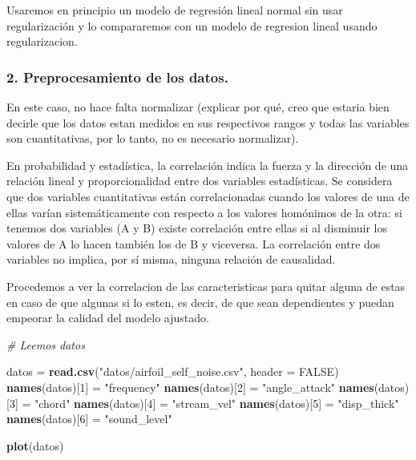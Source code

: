 \documentclass[]{article}
\newenvironment{Shaded}{\begin{snugshade}}{\end{snugshade}}
\newcommand{\KeywordTok}[1]{\textcolor[rgb]{0.13,0.29,0.53}{\textbf{#1}}}
\newcommand{\DataTypeTok}[1]{\textcolor[rgb]{0.13,0.29,0.53}{#1}}
\newcommand{\DecValTok}[1]{\textcolor[rgb]{0.00,0.00,0.81}{#1}}
\newcommand{\StringTok}[1]{\textcolor[rgb]{0.31,0.60,0.02}{#1}}
\newcommand{\CommentTok}[1]{\textcolor[rgb]{0.56,0.35,0.01}{\textit{#1}}}
\newcommand{\OtherTok}[1]{\textcolor[rgb]{0.56,0.35,0.01}{#1}}
\newcommand{\NormalTok}[1]{#1}
\begin{document}
Usaremos en principio un modelo de regresión lineal normal sin usar
regularización y lo compararemos con un modelo de regresion lineal
usando regularizacion.

\subsubsection{2. Preprocesamiento de los
datos.}\label{preprocesamiento-de-los-datos.-1}

En este caso, no hace falta normalizar (explicar por qué, creo que
estaria bien decirle que los datos estan medidos en sus respectivos
rangos y todas las variables son cuantitativas, por lo tanto, no es
necesario normalizar).

En probabilidad y estadística, la correlación indica la fuerza y la
dirección de una relación lineal y proporcionalidad entre dos variables
estadísticas. Se considera que dos variables cuantitativas están
correlacionadas cuando los valores de una de ellas varían
sistemáticamente con respecto a los valores homónimos de la otra: si
tenemos dos variables (A y B) existe correlación entre ellas si al
disminuir los valores de A lo hacen también los de B y viceversa. La
correlación entre dos variables no implica, por sí misma, ninguna
relación de causalidad.

Procedemos a ver la correlacion de las caracteristicas para quitar
alguna de estas en caso de que algunas si lo esten, es decir, de que
sean dependientes y puedan empeorar la calidad del modelo ajustado.

\begin{Shaded}
\begin{Highlighting}[]
\CommentTok{# Leemos datos}

\NormalTok{datos =}\StringTok{ }\KeywordTok{read.csv}\NormalTok{(}\StringTok{"datos/airfoil_self_noise.csv"}\NormalTok{, }\DataTypeTok{header =} \OtherTok{FALSE}\NormalTok{)}
\KeywordTok{names}\NormalTok{(datos)[}\DecValTok{1}\NormalTok{] =}\StringTok{ "frequency"}
\KeywordTok{names}\NormalTok{(datos)[}\DecValTok{2}\NormalTok{] =}\StringTok{ "angle_attack"}
\KeywordTok{names}\NormalTok{(datos)[}\DecValTok{3}\NormalTok{] =}\StringTok{ "chord"}
\KeywordTok{names}\NormalTok{(datos)[}\DecValTok{4}\NormalTok{] =}\StringTok{ "stream_vel"}
\KeywordTok{names}\NormalTok{(datos)[}\DecValTok{5}\NormalTok{] =}\StringTok{ "disp_thick"}
\KeywordTok{names}\NormalTok{(datos)[}\DecValTok{6}\NormalTok{] =}\StringTok{ "sound_level"}

\KeywordTok{plot}\NormalTok{(datos)}
\end{Highlighting}
\end{Shaded}
\end{document}
